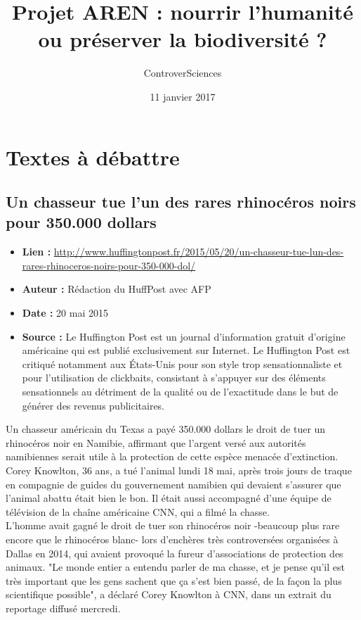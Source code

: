 \documentclass[8pt]{article}
\author{ControverSciences}
\title{Projet AREN : nourrir l’humanité ou préserver la biodiversité ?}
\date{11 janvier 2017}
\begin{document}
\maketitle

\tableofcontents

\newpage
\section{Textes à débattre}
\subsection{Un chasseur tue l'un des rares rhinocéros noirs pour 350.000 dollars}
\begin{itemize}
	\item \textbf{Lien : }  \url{http://www.huffingtonpost.fr/2015/05/20/un-chasseur-tue-lun-des-rares-rhinoceros-noirs-pour-350-000-dol/} 
	\item \textbf{Auteur : } Rédaction du HuffPost avec AFP
	\item \textbf{Date : } 20 mai 2015
	\item \textbf{Source : } Le Huffington Post est un journal d'information gratuit d'origine américaine qui est publié exclusivement sur Internet. Le Huffington Post est critiqué notamment aux États-Unis pour son style trop sensationnaliste et pour l'utilisation de clickbaits, consistant à s'appuyer sur des éléments sensationnels au détriment de la qualité ou de l'exactitude dans le but de générer des revenus publicitaires.
\end{itemize}

Un chasseur américain du Texas a payé 350.000 dollars le droit de tuer un rhinocéros noir en Namibie, affirmant que l'argent versé aux autorités namibiennes serait utile à la protection de cette espèce menacée d'extinction. \\

Corey Knowlton, 36 ans, a tué l'animal lundi 18 mai, après trois jours de traque en compagnie de guides du gouvernement namibien qui devaient s'assurer que l'animal abattu était bien le bon. Il était aussi accompagné d'une équipe de télévision de la chaîne américaine CNN, qui a filmé la chasse. \\

L'homme avait gagné le droit de tuer son rhinocéros noir -beaucoup plus rare encore que le rhinocéros blanc- lors d'enchères très controversées organisées à Dallas en 2014, qui avaient provoqué la fureur d'associations de protection des animaux. "Le monde entier a entendu parler de ma chasse, et je pense qu'il est très important que les gens sachent que ça s'est bien passé, de la façon la plus scientifique possible", a déclaré Corey Knowlton à CNN, dans un extrait du reportage diffusé mercredi. \\
\end{document}
